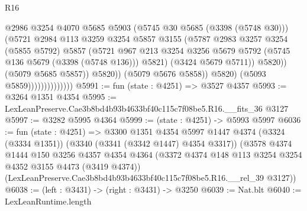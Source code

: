 \begin{lexlean}{R16}
\begin{coremodule}
                                          @2986
                                          @3254
                                          @4070
                                          @5685
                                          @5903
                                          (@5745 @30 @5685 (@3398 (@5748 @30)))
                                          (@5721
                                            @2984
                                            @113
                                            @3259
                                            @3254
                                            @5857
                                            @3155
                                            (@5787
                                              @2983
                                              @3257
                                              @3254
                                              (@5855 @5792)
                                              @5857
                                              (@5721
                                                @967
                                                @213
                                                @3254
                                                @3256
                                                @5679
                                                @5792
                                                (@5745 @136 @5679 (@3398 (@5748 @136)))
                                                @5821)
                                              (@3424 @5679 @5711))
                                            @5820))
                                        (@5079 @5685 @5857))
                                      @5820))
                                  (@5079 @5676 @5858))
                                @5820)
                              (@5093 @5859))))))))))))))
@5991 := fun (state : @4251) => @3527 @4357
@5993 := @3264 @1351 @4354
@5995 := LexLeanPreserve.Cae3b8bd4b93b4633bf40c115c7f08be5.R16.__fits_36 @3127
@5997 := @3282 @5995 @4364
@5999 := (state : @4251) -> @5993 @5997
@6036 := fun (state : @4251) =>
  @3300
    @1351
    @4354
    @5997
    @1447
    @4374
    (@3324 (@3334 @1351))
    (@3340 (@3341 (@3342 @1447) @4354 @3317))
    (@3578
      @4374
      @1444
      @150
      @3256
      @4357
      @4354
      @4364
      (@3372 @4374 @148 @113 @3254 @3254 @4352 @3155 @4473 (@3419 @4374))
      (LexLeanPreserve.Cae3b8bd4b93b4633bf40c115c7f08be5.R16.__rel_39 @3127))
@6038 := (left : @3431) -> (right : @3431) -> @3250
@6039 := Nat.blt
@6040 := LexLeanRuntime.length

\end{coremodule}
\end{lexlean}
